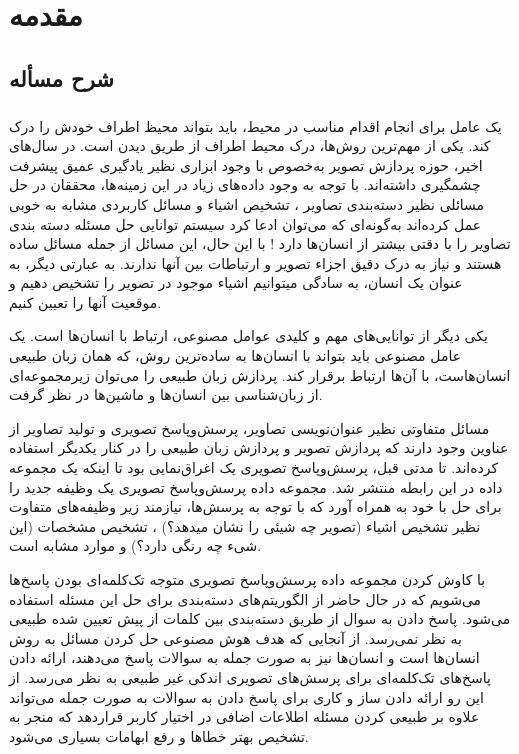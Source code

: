 
\chapter{مقدمه} \label{ch:intro}
\thispagestyle{empty}


\section{شرح مسأله} \label{sec:sharh}
\paragraph{}
{
    یک عامل برای انجام اقدام مناسب در محیط، باید بتواند محیظ اطراف خودش را درک کند.
    یکی از مهم‌ترین روش‌ها، درک محیط اطراف از طریق دیدن است.
    در سال‌های اخیر، حوزه‌ پردازش تصویر به‌خصوص با وجود ابزاری نظیر یادگیری عمیق پیشرفت چشمگیری داشته‌اند. با توجه به
    وجود داده‌های زیاد در این زمینه‌ها، محققان در حل مسائلی نظیر دسته‌بندی تصاویر
    \cite{He_2016_CVPR}
    ، تشخیص اشیاء
    \cite{Redmon_2016_CVPR}
    و مسائل کاربردی مشابه به خوبی عمل کرده‌اند به‌گونه‌ای که می‌توان ادعا کرد سیستم
    توانایی حل مسئله دسته بندی تصاویر را با دقتی بیشتر از انسان‌ها دارد
    \cite{He_2015_ICCV}!
    با این حال، این مسائل از جمله مسائل ساده هستند و نیاز به درک دقیق اجزاء تصویر و ارتباطات بین آنها ندارند. به
    عبارتی دیگر، به عنوان یک انسان، به سادگی میتوانیم اشیاء موجود در تصویر را تشخیص دهیم و موقعیت آنها را تعیین
    کنیم. 

    یکی دیگر از توانایی‌های مهم و کلیدی عوامل مصنوعی، ارتباط با انسان‌ها است. یک عامل
    مصنوعی باید بتواند با انسان‌ها به ساده‌ترین روش، که همان زبان طبیعی انسان‌هاست،
    با آن‌ها ارتباط برقرار کند. پردازش زبان طبیعی را می‌توان زیرمجموعه‌ای از زبان‌شناسی بین
    انسان‌ها و ماشین‌ها در نظر گرفت. 

    مسائل متفاوتی نظیر عنوان‌نویسی تصاویر، پرسش‌و‌پاسخ تصویری و تولید تصاویر از عناوین
    وجود دارند که پردازش تصویر و پردازش زبان‌ طبیعی را در کنار یکدیگر استفاده کرده‌اند. 
     تا مدتی قبل، پرسش‌وپاسخ تصویری یک اغراق‌نمایی بود تا اینکه یک مجموعه داده در این رابطه منتشر شد. مجموعه
     داده پرسش‌وپاسخ تصویری
     \cite{VQA}
     یک وظیفه جدید را برای حل با خود به همراه آورد که با توجه به پرسش‌ها، نیازمند زیر وظیفه‌های
متفاوت نظیر تشخیص اشیاء
 (تصویر چه شیئی را نشان میدهد؟)
 ، تشخیص مشخصات 
(این شیء چه رنگی دارد؟)
و
موارد مشابه است.

با کاوش کردن مجموعه داده پرسش‌وپاسخ تصویری متوجه‌ تک‌کلمه‌ای بودن پاسخ‌ها می‌شویم که در حال حاضر از الگوریتم‌های دسته‌بندی برای حل این مسئله
استفاده می‌شود. پاسخ دادن به سوال از طریق دسته‌بندی بین کلمات از پیش‌ تعیین شده طبیعی به نظر نمی‌رسد. از آنجایی که هدف هوش مصنوعی حل کردن مسائل
به روش انسان‌ها است و انسان‌ها نیز به صورت جمله به سوالات پاسخ می‌دهند، ارائه دادن پاسخ‌های تک‌کلمه‌ای برای پرسش‌های تصویری اندکی غیر طبیعی به نظر
می‌رسد. از این رو ارائه دادن ساز و کاری برای پاسخ دادن به سوالات به صورت جمله می‌تواند علاوه بر طبیعی کردن مسئله اطلاعات اضافی در اختیار کاربر
قراردهد که منجر به تشخیص بهتر خطاها و رفع ابهامات بسیاری می‌شود.
   }

